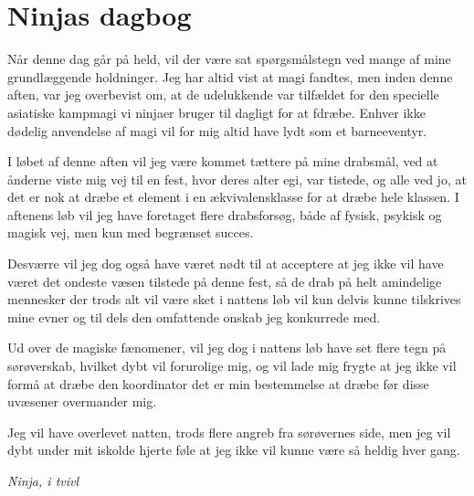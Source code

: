 \begin{minipage}[t]{100mm}
\vspace{3mm}
\section*{Ninjas dagbog}
Når denne dag går på held, vil der være sat spørgsmålstegn ved mange af mine grundlæggende holdninger. Jeg har altid vist at magi fandtes, men inden denne aften, var jeg overbevist om, at de udelukkende var tilfældet for den specielle asiatiske kampmagi vi ninjaer bruger til dagligt for at fdræbe. Enhver ikke dødelig anvendelse af magi vil for mig altid have lydt som et barneeventyr.

I løbet af denne aften vil jeg være kommet tættere på mine drabsmål, ved at ånderne viste mig vej til en fest, hvor deres alter egi, var tistede, og alle ved jo, at det er nok at dræbe et element i en ækvivalensklasse for at dræbe hele klassen. I aftenens løb vil jeg have foretaget flere drabsforsøg, både af fysisk, psykisk og magisk vej, men kun med begrænset succes.

Desværre vil jeg dog også have været nødt til at acceptere at jeg ikke vil have været det ondeste væsen tilstede på denne fest, så de drab på helt amindelige mennesker der trods alt vil være sket i nattens løb vil kun delvis kunne tilskrives mine evner og til dels den omfattende onskab jeg konkurrede med.

Ud over de magiske fænomener, vil jeg dog i nattens løb have set flere tegn på sørøverskab, hvilket dybt vil forurolige mig, og vil lade mig frygte at jeg ikke vil formå at dræbe den koordinator det er min bestemmelse at dræbe før disse uvæsener overmander mig.

Jeg vil have overlevet natten, trods flere angreb fra sørøvernes side, men jeg vil dybt under mit iskolde hjerte føle at jeg ikke vil kunne være så heldig hver gang.

\emph{Ninja, i tvivl}


\end{minipage}
